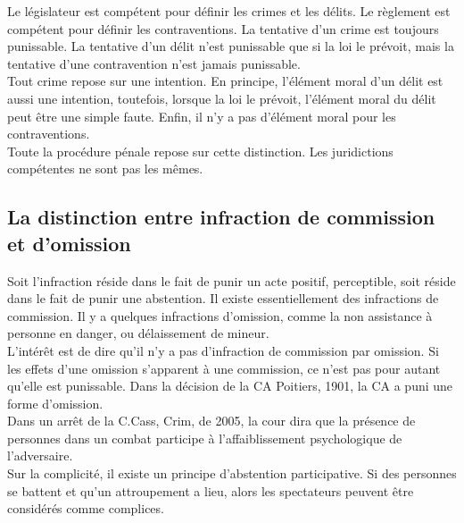 \documentclass[10pt, a4paper, openany]{book}
\begin{document}
Le législateur est compétent pour définir les crimes et les délits. Le règlement est compétent pour définir les contraventions. La tentative d'un crime est toujours punissable. La tentative d'un délit n'est punissable que si la loi le prévoit, mais la tentative d'une contravention n'est jamais punissable. \\
Tout crime repose sur une intention. En principe, l'élément moral d'un délit est aussi une intention, toutefois, lorsque la loi le prévoit, l'élément moral du délit peut être une simple faute. Enfin, il n'y a pas d'élément moral pour les contraventions. \\
Toute la procédure pénale repose sur cette distinction. Les juridictions compétentes ne sont pas les mêmes. 

\subsection{La distinction entre infraction de commission et d'omission}

Soit l'infraction réside dans le fait de punir un acte positif, perceptible, soit réside dans le fait de punir une abstention. Il existe essentiellement des infractions de commission. Il y a quelques infractions d'omission, comme la non assistance à personne en danger, ou délaissement de mineur. \\
L'intérêt est de dire qu'il n'y a pas d'infraction de commission par omission. Si les effets d'une omission s'apparent à une commission, ce n'est pas pour autant qu'elle est punissable. Dans la décision de la CA Poitiers, 1901, la CA a puni une forme d'omission. \\
Dans un arrêt de la C.Cass, Crim, de 2005, la cour dira que la présence de personnes dans un combat participe à l'affaiblissement psychologique de l'adversaire. \\
Sur la complicité, il existe un principe d'abstention participative. Si des personnes se battent et qu'un attroupement a lieu, alors les spectateurs peuvent être considérés comme complices. 
\end{document}

